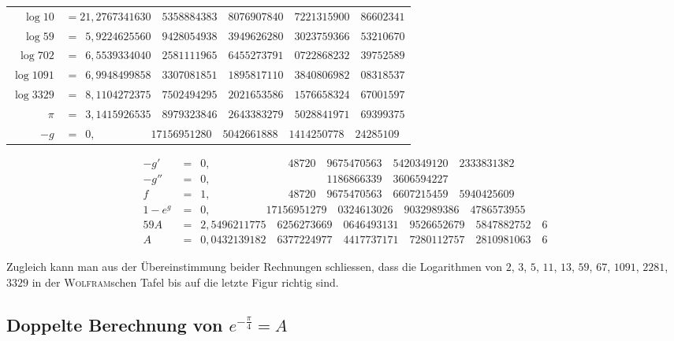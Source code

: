 \documentclass[10pt,a4paper]{article}
\begin{document}
\begin{center}
\begin{tabular}{r@{\,\,}l}
$\log 10$ &$= 21{,}2767341630\quad 5358884383\quad 8076907840\quad 7221315900\quad 86602341$\\
$\log 59$ &$= \phantom{0}5{,}9224625560\quad 9428054938\quad 3949626280\quad 3023759366\quad 53210670$\\
$\log 702$ &$= \phantom{0}6{,}5539334040\quad 2581111965\quad 6455273791\quad 0722868232\quad 39752589$\\
$\log 1091$ &$= \phantom{0}6{,}9948499858\quad 3307081851\quad 1895817110\quad 3840806982\quad 08318537$\\
$\log 3329$ &$= \phantom{0}8{,}1104272375\quad 7502494295\quad 2021653586\quad 1576658324\quad 67001597$\\
$\pi$ &$= \phantom{0}3{,}1415926535\quad 8979323846\quad 2643383279\quad 5028841971\quad 69399375$\\
\hline
$-g$ &$= \phantom{0}0{,}\phantom{0000000000}17156951280\quad 5042661888\quad 1414250778\quad 24285109$
\end{tabular}
\end{center}

\begin{align*}
-g' &= \phantom{0}0{,}\phantom{00000000000000}48720\quad 9675470563\quad 5420349120\quad 2333831382\\
-g''&= \phantom{0}0{,}\phantom{000000000000000000000}1186866339\quad 3606594227\\
f &= \phantom{0}1{,}\phantom{00000000000000}48720\quad 9675470563\quad 6607215459\quad 5940425609\\
1-e^g &= \phantom{0}0{,}\phantom{0000000000}17156951279\quad 0324613026\quad 9032989386\quad 4786573955\\
59A &= \phantom{0}2{,}5496211775\quad 6256273669\quad 0646493131\quad 9526652679\quad 5847882752\quad 6\\
A &= \phantom{0}0{,}0432139182\quad 6377224977\quad 4417737171\quad 7280112757\quad 2810981063\quad 6
\end{align*}

Zugleich kann man aus der Übereinstimmung beider Rechnungen schliessen,
dass die Logarithmen von $2$, $3$, $5$, $11$, $13$, $59$, $67$, $1091$, $2281$, $3329$ in der
\textsc{Wolfram}schen Tafel bis auf die letzte Figur richtig sind.

\subsection*{Doppelte Berechnung von \texorpdfstring{$e^{-\frac{\pi}{4}}=A$}{e\^{}(-pi/4)=A}}
\end{document}
